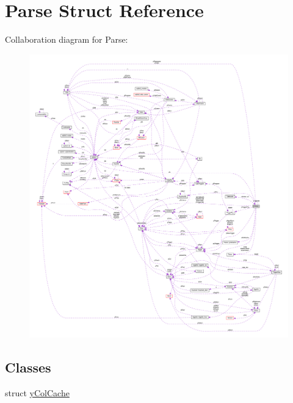 \hypertarget{struct_parse}{\section{Parse Struct Reference}
\label{struct_parse}
}


Collaboration diagram for Parse\-:\nopagebreak
\begin{figure}[H]
\begin{center}
\leavevmode
\includegraphics[width=350pt]{struct_parse__coll__graph}
\end{center}
\end{figure}
\subsection*{Classes}
\begin{DoxyCompactItemize}
\item 
struct \hyperlink{struct_parse_1_1y_col_cache}{y\-Col\-Cache}
\end{DoxyCompactItemize}
